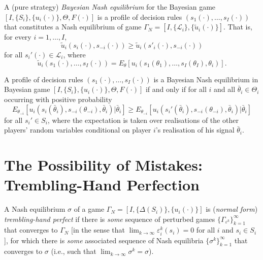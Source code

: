 \begin{defn}
    A (pure strategy) \emph{Bayesian Nash equilibrium} for the Bayesian game $[I, \{S_i\}, \{u_i(\cdot)\}, \Theta, F(\cdot)]$ is a profile of decision rules $(s_1(\cdot), \dots, s_I(\cdot))$ that constitutes a Nash equilibrium of game $\Gamma_N = [I, \{\mathscr{L}_i\}, \{\tilde{u}_i(\cdot)\}]$. That is, for every $i = 1, \dots, I$,
    \begin{equation*}
        \tilde{u}_i \left(s_i(\cdot), s_{-i}(\cdot)\right) \geq \tilde{u}_i \left(s'_i(\cdot), s_{-i}(\cdot)\right)
    \end{equation*}
    for all $s_i'(\cdot) \in \mathscr{L}_i$, where 
    \begin{equation*}
        \tilde{u}_i \left(s_1(\cdot), \dots, s_I(\cdot) \right) = E_\theta \left[ u_i \left(s_1(\theta_1), \dots, s_I(\theta_I), \theta_i \right) \right].
    \end{equation*}
\end{defn}

\begin{prop}
    A profile of decision rules $(s_1(\cdot), \dots, s_I(\cdot))$ is a Bayesian Nash equilibrium in Bayesian game $[I, \{S_i\}, \{u_i(\cdot)\}, \Theta, F(\cdot)]$ if and only if for all $i$ and all $\bar{\theta}_i \in \Theta_i$ occurring with positive probability
    \begin{equation*}
        E_{\theta_{-i}} \left[ u_i \left( s_i (\bar{\theta}_i), s_{-i}(\theta_{-i}), \bar{\theta}_i \right) | \bar{\theta}_i \right] \geq E_{\theta_{-i}} \left[ u_i \left( s_i' (\bar{\theta}_i), s_{-i}(\theta_{-i}), \bar{\theta}_i \right) | \bar{\theta}_i \right]
    \end{equation*}
    for all $s_i' \in S_i$, where the expectation is taken over realisations of the other players' random variables conditional on player $i$'s realisation of his signal $\bar{\theta}_i$.
\end{prop}


\section{The Possibility of Mistakes: Trembling-Hand Perfection}

\begin{defn}
    A Nash equilibrium $\sigma$ of a game $\Gamma_N = [I, \{\Delta(S_i)\}, \{u_i(\cdot)\}]$ is (\emph{normal form}) \emph{trembling-hand perfect} if there is \emph{some} sequence of perturbed games $\{\Gamma_{\varepsilon^k}\}_{k = 1}^\infty$ that converges to $\Gamma_N$ [in the sense that $\lim_{k \rightarrow \infty} \varepsilon_i^k (s_i) = 0$ for all $i$ and $s_i \in S_i$], for which there is \emph{some} associated sequence of Nash equilibria $\{\sigma^k\}_{k = 1}^\infty$ that converges to $\sigma$ (i.e., such that $\lim_{k \rightarrow \infty} \sigma^k = \sigma$).
\end{defn}

